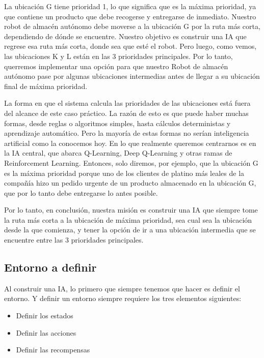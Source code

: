 \documentclass[]{book}
\providecommand{\tightlist}{%
  \setlength{\itemsep}{0pt}\setlength{\parskip}{0pt}}
\begin{document}
La ubicación G tiene prioridad 1, lo que significa que es la máxima prioridad, ya que contiene un producto que debe recogerse y entregarse de inmediato. Nuestro robot de almacén autónomo debe moverse a la ubicación G por la ruta más corta, dependiendo de dónde se encuentre. Nuestro objetivo es construir una IA que regrese esa ruta más corta, donde sea que esté el robot. Pero luego, como vemos, las ubicaciones K y L están en las 3 prioridades principales. Por lo tanto, querremos implementar una opción para que nuestro Robot de almacén autónomo pase por algunas ubicaciones intermedias antes de llegar a su ubicación final de máxima prioridad.

La forma en que el sistema calcula las prioridades de las ubicaciones está fuera del alcance de este caso práctico. La razón de esto es que puede haber muchas formas, desde reglas o algoritmos simples, hasta cálculos deterministas y aprendizaje automático. Pero la mayoría de estas formas no serían inteligencia artificial como la conocemos hoy. En lo que realmente queremos centrarnos es en la IA central, que abarca Q-Learning, Deep Q-Learning y otras ramas de Reinforcement Learning. Entonces, solo diremos, por ejemplo, que la ubicación G es la máxima prioridad porque uno de los clientes de platino más leales de la compañía hizo un pedido urgente de un producto almacenado en la ubicación G, que por lo tanto debe entregarse lo antes posible.

Por lo tanto, en conclusión, nuestra misión es construir una IA que siempre tome la ruta más corta a la ubicación de máxima prioridad, sea cual sea la ubicación desde la que comienza, y tener la opción de ir a una ubicación intermedia que se encuentre entre las 3 prioridades principales.

\hypertarget{entorno-a-definir}{%
\subsection{Entorno a definir}\label{entorno-a-definir}}

Al construir una IA, lo primero que siempre tenemos que hacer es definir el entorno. Y definir un entorno siempre requiere los tres elementos siguientes:

\begin{itemize}
\tightlist
\item
  Definir los estados
\item
  Definir las acciones
\item
  Definir las recompensas
\end{itemize}
\end{document}
